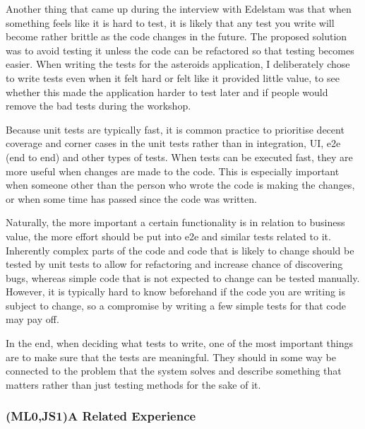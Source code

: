 \documentclass[11pt]{article}
\begin{document}
Another thing that came up during the interview with Edelstam was that when something feels like it is hard to test, it is likely that any test you write will become rather brittle as the code changes in the future. The proposed solution was to avoid testing it unless the code can be refactored so that testing becomes easier. \cite[question~30]{Edelstam} When writing the tests for the asteroids application, I deliberately chose to write tests even when it felt hard or felt like it provided little value, to see whether this made the application harder to test later and if people would remove the bad tests during the workshop.

Because unit tests are typically fast, it is common practice to prioritise decent coverage and corner cases in the unit tests rather than in integration, UI, e2e (end to end) and other types of tests. When tests can be executed fast, they are more useful when changes are made to the code. This is especially important when someone other than the person who wrote the code is making the changes, or when some time has passed since the code was written. \cite[questions~22-24]{Stenmark}

Naturally, the more important a certain functionality is in relation to business value, the more effort should be put into e2e and similar tests related to it. Inherently complex parts of the code and code that is likely to change should be tested by unit tests to allow for refactoring and increase chance of discovering bugs, whereas simple code that is not expected to change can be tested manually. However, it is typically hard to know beforehand if the code you are writing is subject to change, so a compromise by writing a few simple tests for that code may pay off. \cite[questions~28-29 and 33]{Stenmark}

In the end, when deciding what tests to write, one of the most important things are to make sure that the tests are meaningful. They should in some way be connected to the problem that the system solves and describe something that matters rather than just testing methods for the sake of it. \cite[questions~17-18]{Ahnve}

\subsubsection{(ML0,JS1)A Related Experience}
\label{subsec:openspace}
\end{document}
